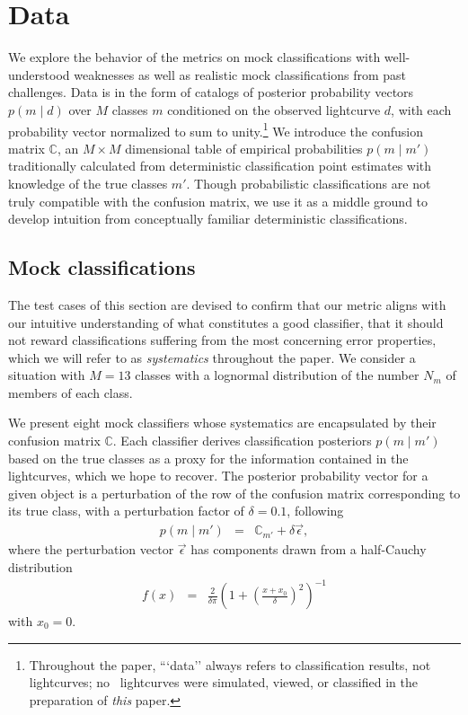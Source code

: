\section{Data}
\label{sec:data}

We explore the behavior of the metrics on mock classifications with well-understood weaknesses as well as realistic mock classifications from past challenges.
Data is in the form of catalogs of posterior probability vectors $p(m \mid d)$ over $M$ classes $m$ conditioned on the observed lightcurve $d$, with each probability vector normalized to sum to unity.\footnote{Throughout the paper, ```data'' always refers to classification results, not lightcurves; no \plasticc\ lightcurves were simulated, viewed, or classified in the preparation of \textit{this} paper.}
We introduce the confusion matrix $\mathbb{C}$, an $M\times M$ dimensional table of empirical probabilities $p(m \mid m')$ traditionally calculated from deterministic classification point estimates with knowledge of the true classes $m'$.
Though probabilistic classifications are not truly compatible with the confusion matrix, we use it as a middle ground to develop intuition from conceptually familiar deterministic classifications.

\subsection{Mock classifications}
\label{sec:mockdata}

The test cases of this section are devised to confirm that our metric aligns with our intuitive understanding of what constitutes a good classifier, that it should not reward classifications suffering from the most concerning error properties, which we will refer to as \textit{systematics} throughout the paper.
We consider a situation with $M=13$ classes
with a lognormal distribution of the number $N_{m}$ of members of each class.

We present eight mock classifiers whose systematics are encapsulated by their confusion matrix $\mathbb{C}$.
Each classifier derives classification posteriors $p(m \mid m')$ based on the true classes as a proxy for the information contained in the lightcurves, which we hope to recover.
The posterior probability vector for a given object is a perturbation of the row of the confusion matrix corresponding to its true class, with a perturbation factor of $\delta=0.1$, following
\begin{eqnarray}
  \label{eq:cmtoprob}
  p(m \mid m') &=& \mathbb{C}_{m'} + \delta\vec{\epsilon},
\end{eqnarray}
where the perturbation vector $\vec{\epsilon}$ has components drawn from a half-Cauchy distribution
\begin{eqnarray}
  \label{eq:cauchy}
  f(x) &=& \frac{2}{\delta\pi} \left(1+\left(\frac{x+x_{0}}{\delta}\right)^{2}\right)^{-1}
\end{eqnarray}
with $x_{0}=0$.

